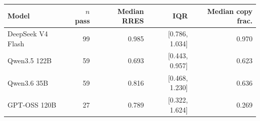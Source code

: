 \begin{tabular}{lrrrr}
\toprule
\textbf{Model} & \textbf{$n$ pass} & \textbf{Median RRES} & \textbf{IQR} & \textbf{Median copy frac.} \\
\midrule
DeepSeek V4 Flash & 99 & 0.985 & [0.786, 1.034] & 0.970 \\
Qwen3.5 122B & 59 & 0.693 & [0.443, 0.957] & 0.623 \\
Qwen3.6 35B & 59 & 0.816 & [0.468, 1.230] & 0.636 \\
GPT-OSS 120B & 27 & 0.789 & [0.322, 1.624] & 0.269 \\
\bottomrule
\end{tabular}
